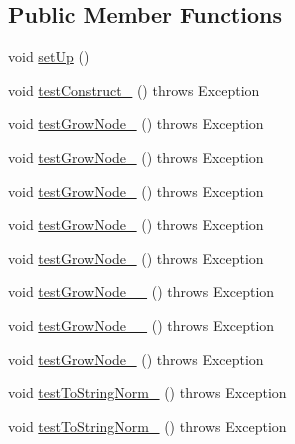 \subsection*{Public Member Functions}
\begin{DoxyCompactItemize}
\item 
void \hyperlink{classorg_1_1jgap_1_1gp_1_1impl_1_1_program_chromosome_test_a79befb128ab505905dee1db0b58b5d6a}{set\-Up} ()
\item 
void \hyperlink{classorg_1_1jgap_1_1gp_1_1impl_1_1_program_chromosome_test_a0a7655f2b357db58eb963f3d2057bcb0}{test\-Construct\-\_} ()  throws Exception 
\item 
void \hyperlink{classorg_1_1jgap_1_1gp_1_1impl_1_1_program_chromosome_test_af0fc62691e3b36dff906225f408fb800}{test\-Grow\-Node\-\_} ()  throws Exception 
\item 
void \hyperlink{classorg_1_1jgap_1_1gp_1_1impl_1_1_program_chromosome_test_ad9239c002f3b72948f8cb5ab970d4fc8}{test\-Grow\-Node\-\_} ()  throws Exception 
\item 
void \hyperlink{classorg_1_1jgap_1_1gp_1_1impl_1_1_program_chromosome_test_a4c3019076260a1b4f3f34f5641282434}{test\-Grow\-Node\-\_} ()  throws Exception 
\item 
void \hyperlink{classorg_1_1jgap_1_1gp_1_1impl_1_1_program_chromosome_test_aef6cc2124d212631e5c9e9ac85575700}{test\-Grow\-Node\-\_} ()  throws Exception 
\item 
void \hyperlink{classorg_1_1jgap_1_1gp_1_1impl_1_1_program_chromosome_test_a29124aa09af3792059a81462918a33e7}{test\-Grow\-Node\-\_} ()  throws Exception 
\item 
void \hyperlink{classorg_1_1jgap_1_1gp_1_1impl_1_1_program_chromosome_test_a1e95c60b5f94b1cb7863246ae9ee35e5}{test\-Grow\-Node\-\_\-\_} ()  throws Exception 
\item 
void \hyperlink{classorg_1_1jgap_1_1gp_1_1impl_1_1_program_chromosome_test_abd33ed57adf33ae634f8563a9dc52a4f}{test\-Grow\-Node\-\_\-\_} ()  throws Exception 
\item 
void \hyperlink{classorg_1_1jgap_1_1gp_1_1impl_1_1_program_chromosome_test_ae9488a43939ea79aac966839a2970a69}{test\-Grow\-Node\-\_} ()  throws Exception 
\item 
void \hyperlink{classorg_1_1jgap_1_1gp_1_1impl_1_1_program_chromosome_test_a76135428921ff46a49d0efb566f337cf}{test\-To\-String\-Norm\-\_} ()  throws Exception 
\item 
void \hyperlink{classorg_1_1jgap_1_1gp_1_1impl_1_1_program_chromosome_test_a32b49f14fadf0f9c272e8ecdf622d1c2}{test\-To\-String\-Norm\-\_} ()  throws Exception 

\end{DoxyCompactItemize}
